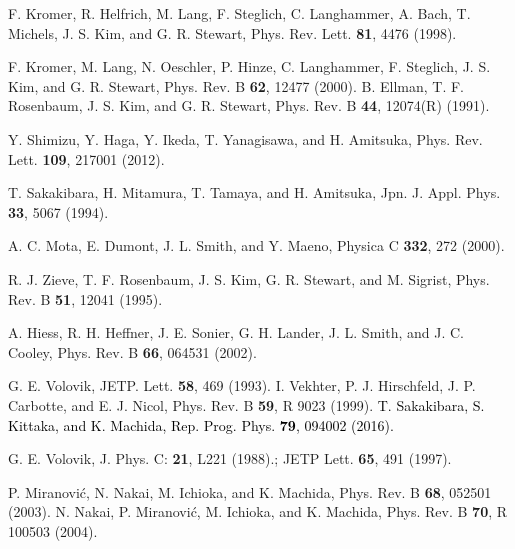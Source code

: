 \documentclass[twocolumn, prl]{revtex4}%
\newcommand{\correct}[1]{\textcolor{black}{#1}}
\begin{document}
\begin{thebibliography}{99}
\color{black}



 F. Kromer, R. Helfrich, M. Lang, F. Steglich, C. Langhammer, A. Bach, T. Michels, J. S. Kim, and G. R. Stewart, Phys. Rev. Lett. {\bf81}, 4476 (1998).

 F. Kromer, M. Lang, N. Oeschler, P. Hinze, C. Langhammer, F. Steglich,  J. S. Kim, and G. R. Stewart, Phys. Rev. B {\bf62}, 12477 (2000).
 B. Ellman, T. F. Rosenbaum, J. S. Kim, and G. R. Stewart, Phys. Rev. B {\bf44}, 12074(R) (1991). 

 Y. Shimizu, Y. Haga, Y. Ikeda, T. Yanagisawa, and H. Amitsuka, Phys. Rev. Lett. {\bf109}, 217001 (2012).



 T. Sakakibara, H. Mitamura, T. Tamaya, and H. Amitsuka, Jpn. J. Appl. Phys. {\bf33}, 5067 (1994).
 
 A. C. Mota, E. Dumont, J. L. Smith, and Y. Maeno, Physica C {\bf 332}, 272 (2000).

 R. J. Zieve, T. F. Rosenbaum, J. S. Kim, G. R. Stewart, and M. Sigrist, Phys. Rev. B {\bf 51}, 12041 (1995).


 A. Hiess, R. H. Heffner, J. E. Sonier, G. H. Lander, J. L. Smith, and J. C. Cooley, 
 Phys. Rev. B {\bf66}, 064531 (2002).



  G. E. Volovik, JETP. Lett. {\bf58}, 469 (1993).
 I. Vekhter, P. J. Hirschfeld, J. P. Carbotte, and E. J. Nicol, Phys. Rev. B {\bf59}, R 9023 (1999).
\correct{ T. Sakakibara, S. Kittaka, and K. Machida,
 Rep. Prog. Phys. {\bf 79}, 094002 (2016). } 

 G. E. Volovik, J. Phys. C: {\bf21}, L221 (1988).; 
  JETP Lett. {\bf 65}, 491 (1997).

 P. Miranovi\'{c}, N. Nakai, M. Ichioka, and K. Machida, Phys. Rev. B {\bf68}, 052501 (2003).
  N. Nakai, P. Miranovi\'{c}, M. Ichioka, and K. Machida, Phys. Rev. B {\bf70}, R 100503 (2004).





\end{thebibliography}
\end{document}
